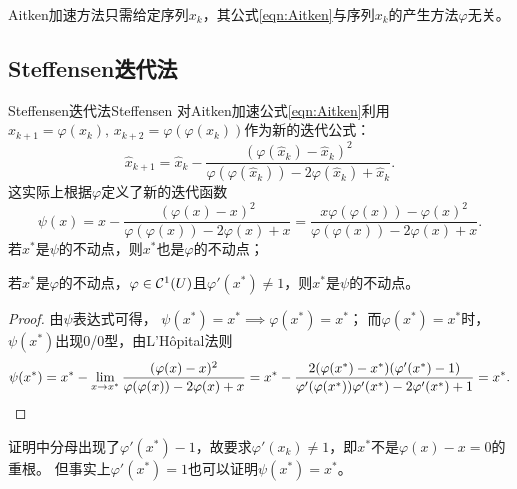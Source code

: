 \begin{remark}
    Aitken加速方法只需给定序列$x_k$，其公式\eqref{eqn:Aitken}与序列$x_k$的产生方法$\varphi$无关。
\end{remark}

\subsection{Steffensen迭代法}

\begin{theorem}
    {Steffensen迭代法}{Steffensen}
    对Aitken加速公式\eqref{eqn:Aitken}利用$x_{k+1} = \varphi(x_k),\,x_{k+2} = \varphi(\varphi(x_k))$作为新的迭代公式：
    \begin{equation}\label{eq:na-steffensen-iteration}
        \hat x_{k+1} = \hat x_k - \frac{(\varphi(\hat x_k) - \hat x_k)^2}{\varphi(\varphi(\hat x_k)) - 2\varphi(\hat x_k) + \hat x_k}.
    \end{equation}
    这实际上根据$\varphi$定义了新的迭代函数
    \begin{equation}
        \psi(x) = x - \frac{(\varphi(x) - x)^2}{\varphi(\varphi(x)) - 2\varphi(x) + x} = \frac{x\varphi(\varphi(x)) - \varphi(x)^2}{\varphi(\varphi(x)) - 2\varphi(x) + x}.
    \end{equation}
    若$x^*$是$\psi$的不动点，则$x^*$也是$\varphi$的不动点；

    若$x^*$是$\varphi$的不动点，$\varphi \in \mathcal{C}^1(U)$且$\varphi'(x^*) \neq 1$，则$x^*$是$\psi$的不动点。
\end{theorem}

\begin{proof}
    由$\psi$表达式可得，
    $\psi(x^*) = x^* \implies \varphi(x^*) = x^*$；
    而$\varphi(x^*) = x^*$时，$\psi(x^*)$出现0/0型，由L'H\^opital法则
    \[
        \psi(x^*) = x^* - \lim_{x\to x^*}\frac{(\varphi(x) - x)^2}{\varphi(\varphi(x)) - 2\varphi(x) + x} = x^* - \frac{2(\varphi(x^*) - x^*)(\varphi'(x^*) - 1)}{\varphi'(\varphi(x^*))\varphi'(x^*) - 2\varphi'(x^*) + 1} = x^*.
        \qedhere
    \]
\end{proof}

\begin{remark}
    证明中分母出现了$\varphi'(x^*) - 1$，故要求$\varphi'(x_k) \neq 1$，即$x^*$不是$\varphi(x) - x = 0$的重根。
    但事实上$\varphi'(x^*) = 1$也可以证明$\psi(x^*) = x^*$。
\end{remark}

